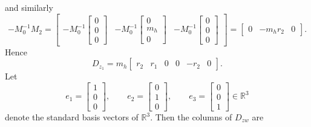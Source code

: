 \documentclass[11pt]{article}
\newcommand{\R}{\mathbb{R}}
\begin{document}
and similarly
\begin{equation}
    -M_0^{-1}M_2
    =
    \begin{bmatrix}
        -M_0^{-1}\!\begin{bmatrix} 0 \\ 0 \\ 0 \end{bmatrix} &
        -M_0^{-1}\!\begin{bmatrix} 0 \\ m_h \\ 0 \end{bmatrix} &
        -M_0^{-1}\!\begin{bmatrix} 0 \\ 0 \\ 0 \end{bmatrix}
    \end{bmatrix}
    =
    \begin{bmatrix}
        0 & -m_h r_2 & 0
    \end{bmatrix}.
    \label{eq:M0invM2}
\end{equation}
Hence
\begin{equation}
    D_{z_1}
    =
    m_h
    \begin{bmatrix}
        r_2 & r_1 & 0 & 0 & -r_2 & 0
    \end{bmatrix}.
    \label{eq:Dz1structure}
\end{equation}
Let
\begin{equation}
    e_1 =
    \begin{bmatrix}
        1 \\ 0 \\ 0
    \end{bmatrix},
    \qquad
    e_2 =
    \begin{bmatrix}
        0 \\ 1 \\ 0
    \end{bmatrix},
    \qquad
    e_3 =
    \begin{bmatrix}
        0 \\ 0 \\ 1
    \end{bmatrix}
    \in \R^3
    \label{eq:basisvectors}
\end{equation}
denote the standard basis vectors of $\R^3$. Then the columns of $D_{zw}$ are
\end{document}
